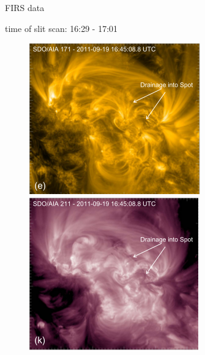 \documentclass{beamer}
\begin{document}
\begin{frame}{FIRS data}

time of slit scan: 16:29 - 17:01

\begin{figure}[H]
  \centering
  \begin{minipage}[b]{0.4\textwidth}
    \includegraphics[scale=0.5]{img3.png}
  \end{minipage}
  \hfill
  \begin{minipage}[b]{0.4\textwidth}
    \includegraphics[scale=0.5]{img4.png}
  \end{minipage}
\end{figure}

 



\end{frame}
\end{document}
